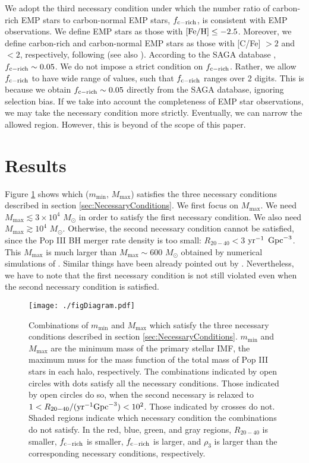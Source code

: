\documentclass[pdftex]{pasj01}
\newcommand{\msun}{M_\odot}
\newcommand{\pyr}{{\rm yr}^{-1}}
\newcommand{\cgpc}{{\rm Gpc}^{-3}}
\newcommand{\dthree}{\rho_{3}}
\newcommand{\mlmax}{M_{\max}}
\newcommand{\msmin}{m_{\min}}
\newcommand{\ratetarget}{R_{20-40}}
\newcommand{\fcemp}{f_{\rm c-rich}}
\begin{document}
We adopt the third necessary condition under which the number ratio of
carbon-rich EMP stars to carbon-normal EMP stars, $\fcemp$, is
consistent with EMP observations. We define EMP stars as those with
${\rm [Fe/H]} \le -2.5$.  Moreover, we define carbon-rich and
carbon-normal EMP stars as those with [C/Fe] $>2$ and $<2$,
respectively, following \citet{2017MNRAS.472L.115C} (see also
\cite{2016ApJ...833...20Y}). According to the SAGA database
\citep{2008PASJ...60.1159S}, $\fcemp \sim 0.05$. We do not impose a
strict condition on $\fcemp$. Rather, we allow $\fcemp$ to have wide
range of values, such that $\fcemp$ ranges over 2 digits.  This is
because we obtain $\fcemp \sim 0.05$ directly from the SAGA database,
ignoring selection bias. If we take into account the completeness of
EMP star observations, we may take the necessary condition more
strictly. Eventually, we can narrow the allowed region. However, this
is beyond of the scope of this paper.

\section{Results}
\label{sec:Results}

Figure \ref{fig:figDiagram} shows which ($\msmin$, $\mlmax$) satisfies
the three necessary conditions described in section
\ref{sec:NecessaryConditions}. We first focus on $\mlmax$. We need
$\mlmax \lesssim 3 \times 10^4$ $\msun$ in order to satisfy the first
necessary condition. We also need $\mlmax \gtrsim 10^4$
$\msun$. Otherwise, the second necessary condition cannot be
satisfied, since the Pop III BH merger rate density is too small:
$\ratetarget < 3$ $\pyr$ $\cgpc$. This $\mlmax$ is much larger than
$\mlmax \sim 600$ $\msun$ obtained by numerical simulations of
\citet{2020MNRAS.492.4386S}. Similar things have been already pointed
out by \citet{2016MNRAS.460L..74H}. Nevertheless, we have to note that
the first necessary condition is not still violated even when the
second necessary condition is satisfied.

\begin{figure*}
 \begin{center}
  \texttt{[image: ./figDiagram.pdf]}
 \end{center}
\caption{Combinations of $\msmin$ and $\mlmax$ which satisfy the three
  necessary conditions described in section
  \ref{sec:NecessaryConditions}. $\msmin$ and $\mlmax$ are the minimum
  mass of the primary stellar IMF, the maximum muss for the mass
  function of the total mass of Pop III stars in each halo,
  respectively. The combinations indicated by open circles with dots
  satisfy all the necessary conditions. Those indicated by open
  circles do so, when the second necessary is relaxed to $1 <
  \ratetarget/(\pyr \cgpc) < 10^2$. Those indicated by crosses do
  not. Shaded regions indicate which necessary condition the
  combinations do not satisfy. In the red, blue, green, and gray
  regions, $\ratetarget$ is smaller, $\fcemp$ is smaller, $\fcemp$ is
  larger, and $\dthree$ is larger than the corresponding necessary
  conditions, respectively.} \label{fig:figDiagram}
\end{figure*}
\end{document}
